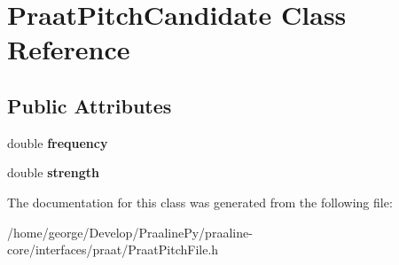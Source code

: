 \hypertarget{class_praat_pitch_candidate}{}\section{Praat\+Pitch\+Candidate Class Reference}
\label{class_praat_pitch_candidate}
\subsection*{Public Attributes}
\begin{DoxyCompactItemize}
\item 
\mbox{\label{class_praat_pitch_candidate_abfd9d7f8b12d4936433d68c168b02760}} 
double {\bfseries frequency}
\item 
\mbox{\label{class_praat_pitch_candidate_a84254211e733baed301776a8c3bc8bdc}} 
double {\bfseries strength}
\end{DoxyCompactItemize}


The documentation for this class was generated from the following file\+:\begin{DoxyCompactItemize}
\item 
/home/george/\+Develop/\+Praaline\+Py/praaline-\/core/interfaces/praat/Praat\+Pitch\+File.\+h\end{DoxyCompactItemize}
